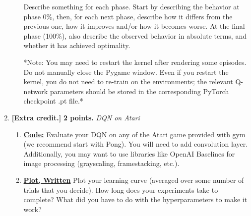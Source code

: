 \documentclass{article}
\begin{document}
\begin{enumerate}
\begin{enumerate}
    Describe something for each phase. Start by describing the behavior at phase 0\%, then, for each next phase, describe how it differs from the previous one, how it improves and/or how it becomes worse. At the final phase (100\%), also describe the observed behavior in absolute terms, and whether it has achieved optimality.
    
    *Note: You may need to restart the kernel after rendering some episodes. Do not manually close the Pygame window. Even if you restart the kernel, you do not need to re-train on the environments; the relevant Q-network parameters should be stored in the corresponding PyTorch checkpoint .pt file.*
\end{enumerate}


\item \textbf{[Extra credit.]} \textbf{2 points.} \textit{DQN on Atari}


\begin{enumerate}
	\item \uline{\textbf{Code:}} Evaluate your DQN on any of the Atari game provided with gym (we recommend start with Pong). You will need to add convolution layer. Additionally, you may want to use libraries like OpenAI Baselines for image processing (grayscaling, framestacking, etc.). 
	\item \uline{\textbf{Plot, Written}} Plot your learning curve (averaged over some number of trials that you decide). How long does your experiments take to complete? What did you have to do with the hyperparameters to make it work?
\end{enumerate}



\end{enumerate}
\end{document}
